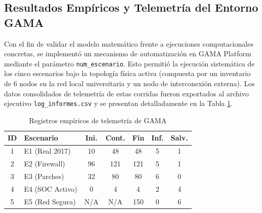 \subsection{Resultados Empíricos y Telemetría del Entorno GAMA}
Con el fin de validar el modelo matemático frente a ejecuciones computacionales concretas, se implementó un mecanismo de automatización en GAMA Platform mediante el parámetro \texttt{num\_escenario}. Esto permitió la ejecución sistemática de los cinco escenarios bajo la topología física activa (compuesta por un inventario de 6 nodos en la red local universitaria y un nodo de interconexión externa). Los datos consolidados de telemetría de estas corridas fueron exportados al archivo ejecutivo \texttt{log\_informes.csv} y se presentan detalladamente en la Tabla \ref{tab:telemetria_gama}.

\begin{table}[htbp]
\caption{Registros empíricos de telemetría de GAMA}
\label{tab:telemetria_gama}
\begin{center}
\footnotesize
\setlength{\tabcolsep}{3.5pt}
\begin{tabular}{|c|l|c|c|c|c|c|}
\hline
\textbf{ID} & \textbf{Escenario} & \textbf{Ini.} & \textbf{Cont.} & \textbf{Fin} & \textbf{Inf.} & \textbf{Salv.} \\ \hline
1 & E1 (Real 2017) & 10 & 48 & 48 & 5 & 1 \\ \hline
2 & E2 (Firewall) & 96 & 121 & 121 & 5 & 1 \\ \hline
3 & E3 (Parches) & 32 & 80 & 80 & 6 & 0 \\ \hline
4 & E4 (SOC Activo) & 0 & 4 & 4 & 2 & 4 \\ \hline
5 & E5 (Red Segura) & N/A & N/A & 150 & 0 & 6 \\ \hline
\end{tabular}
\end{center}
\end{table}

